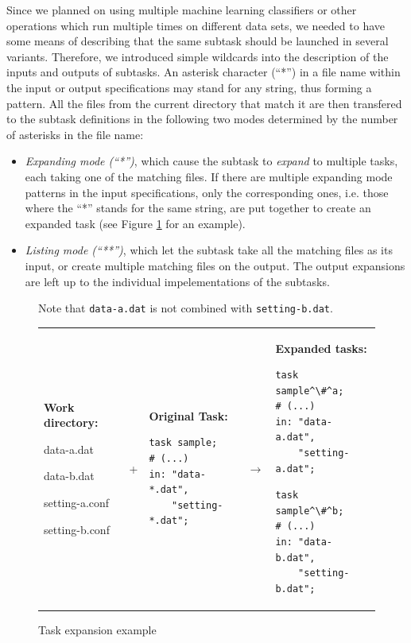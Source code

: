 \documentclass[12pt,notitlepage]{report}
\begin{document}
Since we planned on using multiple machine learning classifiers or other operations which run multiple times on different data sets, we needed to have some means of describing that the same subtask should be launched in several variants. Therefore, we introduced simple wildcards into the description of the inputs and outputs of subtasks. An asterisk character (``*'') in a file name within the input or output specifications may stand for any string, thus forming a pattern. All the files from the current directory that match it are then transfered to the subtask definitions in the following two modes determined by the number of asterisks in the file name:
\begin{itemize}
    \item \emph{Expanding mode (``*'')}, which cause the subtask to \emph{expand} to multiple tasks, each taking one of the matching files. If there are multiple expanding mode patterns in the input specifications, only the corresponding ones, i.e. those where the ``*'' stands for the same string, are put together to create an expanded task (see Figure \ref{fig:expansion} for an example).
    \item \emph{Listing mode (``**'')}, which let the subtask take all the matching files as its input, or create multiple matching files on the output. The output expansions are left up to the individual impelementations of the subtasks.
\end{itemize}

\begin{figure}
\caption{Task expansion example}\label{fig:expansion}\footnotesize
\begin{center}
Note that \texttt{data-a.dat} is not combined with \texttt{setting-b.dat}.

\begin{tabular}{m{3cm} c m{4.1cm} c m{4.1cm}}
\textbf{Work directory:}\par data-a.dat \par data-b.dat \par setting-a.conf \par setting-b.conf &
+ & 
\textbf{Original Task:} \par \begin{lstlisting}
task sample;
# (...)
in: "data-*.dat", 
    "setting-*.dat";\end{lstlisting} &
$\rightarrow$ &
\textbf{Expanded tasks:} \par \begin{lstlisting}
task sample^\#^a;
# (...)
in: "data-a.dat", 
    "setting-a.dat";\end{lstlisting} \par \begin{lstlisting}
task sample^\#^b;
# (...)
in: "data-b.dat", 
    "setting-b.dat";\end{lstlisting}
\end{tabular}
\end{center}
\end{figure}
\end{document}
